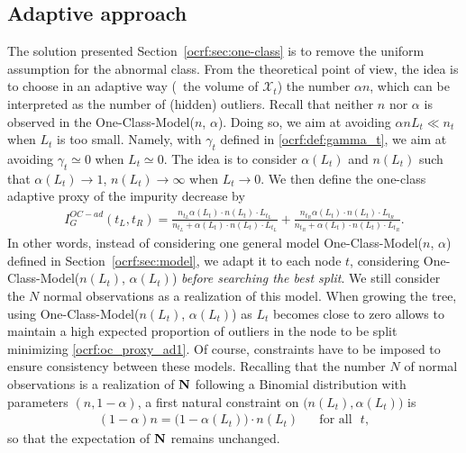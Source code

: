 
\subsection{Adaptive approach}

The solution presented Section~\ref{ocrf:sec:one-class} is to remove the uniform assumption for the abnormal class. From the theoretical point of view, the idea is to choose in an adaptive way (\wrt~the volume of $\mathcal{X}_t$) the number $\alpha n$, which can be interpreted as the number of (hidden) outliers. Recall that neither $n$ nor $\alpha$ is observed in the One-Class-Model($n$, $\alpha$). Doing so, we aim at avoiding $\alpha n L_t \ll n_t$ when $L_t$ is too small. Namely, with $\gamma_t$ defined in \eqref{ocrf:def:gamma_t}, we aim at avoiding $\gamma_t \simeq 0$ when $L_t \simeq 0$. The idea is to consider $\alpha(L_t)$ and $n(L_t)$ such that $\alpha(L_t) \to 1$, $n(L_t) \to \infty$ when $L_t \to 0$.
We then define the one-class adaptive proxy of the impurity decrease by
\begin{align}
\label{ocrf:oc_proxy_ad1}
I_G^{OC-ad}(t_L, t_R)= \frac{n_{t_L}\alpha(L_t) \cdot n(L_t) \cdot L_{t_L}}{n_{t_L} + \alpha(L_t) \cdot n(L_t) \cdot L_{t_L}} + \frac{n_{t_R}\alpha(L_t) \cdot n(L_t) \cdot L_{t_R}}{n_{t_R} + \alpha(L_t) \cdot n(L_t) \cdot L_{t_R}}.
\end{align}
In other words, instead of considering one general model One-Class-Model($n$, $\alpha$) defined in Section~\ref{ocrf:sec:model}, we adapt it to each node $t$, considering One-Class-Model($n(L_t)$, $\alpha(L_t)$) \emph{before searching the best split}. We still consider the $N$ normal observations as a realization of this model. When growing the tree, using One-Class-Model($n(L_t)$, $\alpha(L_t)$) as $L_t$ becomes close to zero allows to maintain a high expected proportion of outliers in the node to be split minimizing \eqref{ocrf:oc_proxy_ad1}.
Of course, constraints have to be imposed to ensure consistency between these models.
%
Recalling that the number $N$ of normal observations is a realization of $\mathbf N$ following a Binomial distribution with parameters $(n, 1-\alpha)$, a first natural constraint on $\big(n(L_t), \alpha(L_t)\big)$ is
\begin{align}
\label{ocrf:constraint1}
(1-\alpha)n = \big(1-\alpha(L_t)\big) \cdot n(L_t) \text{~~~~~for all~~} t,
\end{align}
so that the expectation of $\mathbf N$ remains unchanged. %
%

